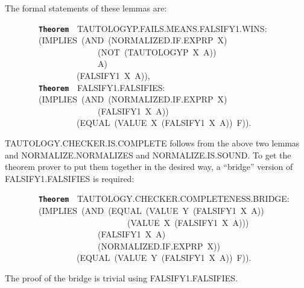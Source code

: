 \documentclass[11pt]{book}
\newenvironment{pubasis}{\begin{flushleft}\ttfamily\small}{\normalsize\rmfamily\end{flushleft}}
\newcommand{\axiomordefinition}[1]{\vspace{6pt}\texttt{\textbf{#1}}}
\begin{document}
The formal statements of these lemmas are:
\begin{pubasis}
~~~~~~~~\axiomordefinition{Theorem}~~TAU\-TOL\-OGYP.FAILS.MEANS.FAL\-SI\-FY1.WINS:\\
~~~~~~~~(IMPLIES~(AND~(NOR\-MAL\-IZED.IF.EXPRP~X)\\
~~~~~~~~~~~~~~~~~~~~~~(NOT~(TAUTOLOGYP~X~A))\\
~~~~~~~~~~~~~~~~~~~~~~A)\\
~~~~~~~~~~~~~~~~~(FALSIFY1~X~A)),\\

~~~~~~~~\axiomordefinition{Theorem}~~FAL\-SI\-FY1.FALSIFIES:\\
~~~~~~~~(IMPLIES~(AND~(NOR\-MAL\-IZED.IF.EXPRP~X)\\
~~~~~~~~~~~~~~~~~~~~~~(FALSIFY1~X~A))\\
~~~~~~~~~~~~~~~~~(EQUAL~(VALUE~X~(FALSIFY1~X~A))~F)).\\
\end{pubasis}
TAU\-TOL\-OGY.CHECK\-ER.IS.COMPLETE follows from the above two
lemmas and NOR\-MAL\-IZE.NOR\-MAL\-IZES and NOR\-MAL\-IZE.IS.SOUND.  To get
the theorem prover to put them together in the desired way,
a ``bridge'' version of FAL\-SI\-FY1.FALSIFIES is required:
\begin{pubasis}
~~~~~~~~\axiomordefinition{Theorem}~~TAU\-TOL\-OGY.CHECK\-ER.COMPLETENESS.BRIDGE:\\
~~~~~~~~(IMPLIES~(AND~(EQUAL~(VALUE~Y~(FALSIFY1~X~A))\\
~~~~~~~~~~~~~~~~~~~~~~~~~~~~~(VALUE~X~(FALSIFY1~X~A)))\\
~~~~~~~~~~~~~~~~~~~~~~(FALSIFY1~X~A)\\
~~~~~~~~~~~~~~~~~~~~~~(NOR\-MAL\-IZED.IF.EXPRP~X))\\
~~~~~~~~~~~~~~~~~(EQUAL~(VALUE~Y~(FALSIFY1~X~A))~F)).\\
\end{pubasis}
The proof of the bridge is trivial using FAL\-SI\-FY1.FALSIFIES.
\end{document}
